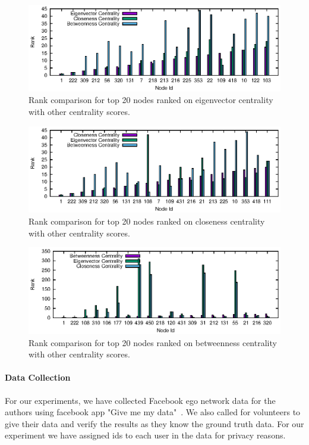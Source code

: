 \begin{figure}[ht]
    \centering
    \includegraphics[width=1\textwidth]{figures/social-result_eigen.eps}
    \caption{Rank comparison for top 20 nodes ranked on eigenvector centrality with other centrality scores.}
    \label{fig:social-result-eigen}
\end{figure}

\begin{figure}[ht]
    \centering
    \includegraphics[width=1\textwidth]{figures/social-result_closeness.eps}
    \caption{Rank comparison for top 20 nodes ranked on closeness centrality with other centrality scores.}
    \label{fig:social-result-closeness}
\end{figure}

\begin{figure}[ht]
    \centering
    \includegraphics[width=1\textwidth]{figures/social-result_betweenness.eps}
    \caption{Rank comparison for top 20 nodes ranked on betweenness centrality with other centrality scores.}
    \label{fig:social-result-betweenness}
\end{figure}

\paragraph{Data Collection}
For our experiments, we have collected Facebook ego network data for
the authors using facebook app "Give me my data"~\cite{givememydata}.
We also called for volunteers to give their data and verify the
results as they know the ground truth data.  For our experiment we
have assigned ids to each user in the data for privacy reasons. 

